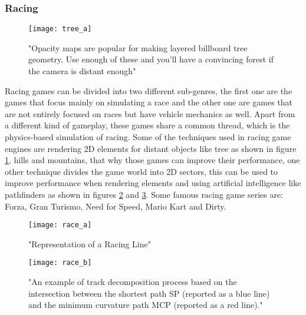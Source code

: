 \subsubsection{Racing}

\begin{figure}[!h] \centering \texttt{[image: tree\_a]} \caption{"Opacity maps are popular for making layered billboard tree geometry. Use enough of
these and you’ll have a convincing forest if the camera is distant enough"\cite{AnIntroductionToComputerGraphicsForArtists}} \label{fig:racing-tree} \end{figure}

Racing games can be divided into two different sub-genres, the first one are the games that focus mainly on simulating a race and the other one are games that are not entirely focused on races but have vehicle mechanics as well. Apart from a different kind of gameplay, these games share a common thread, which is the physics-based simulation of racing\cite{AIGameEngineProgramming}. Some of the techniques used in racing game engines are rendering 2D elements for distant objects like tree as shown in figure \ref{fig:racing-tree}, hills and mountains, that why those games can improve their performance, one other technique divides the game world into 2D sectors, this can be used to improve performance when rendering elements and using artificial intelligence like pathfinders\cite{GameEngineArchitecture} as shown in figures \ref{fig:racing-path-a} and \ref{fig:racing-path-b}. Some famous racing game series are: Forza, Gran Turismo, Need for Speed, Mario Kart and Dirty\cite{RacingGames}.

\begin{figure}[!h] \centering \texttt{[image: race\_a]} \caption{"Representation of a Racing Line"\cite{SearchingForTheOptimalRacingLineUsingGeneticAlgorithms}} \label{fig:racing-path-a} \end{figure}

\begin{figure}[!h] \centering \texttt{[image: race\_b]} \caption{"An example of track decomposition process based on the intersection between the shortest path SP (reported as a blue line) and the minimum curvature path MCP (reported as a red line)."\cite{SearchingForTheOptimalRacingLineUsingGeneticAlgorithms}} \label{fig:racing-path-b} \end{figure}
